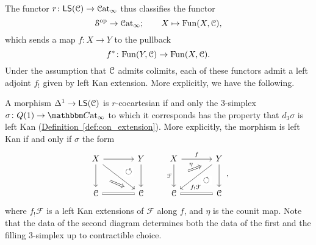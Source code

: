 \documentclass[main.tex]{subfiles}
\begin{document}
The functor $r\colon \mathsf{LS}(\mathcal{C}) \to \mathcal{C}\mathrm{at}_{\infty}$ thus classifies the functor
\begin{equation*}
  \mathcal{S}^{\mathrm{op}} \to \mathcal{C}\mathrm{at}_{\infty};\qquad X \mapsto \mathrm{Fun}(X, \mathcal{C}),
\end{equation*}
which sends a map $f\colon X \to Y$ to the pullback
\begin{equation*}
  f^{*}\colon \mathrm{Fun}(Y, \mathcal{C}) \to \mathrm{Fun}(X, \mathcal{C}).
\end{equation*}
Under the assumption that $\mathcal{C}$ admits colimits, each of these functors admit a left adjoint $f_{!}$ given by left Kan extension. More explicitly, we have the following.
\begin{proposition}
  A morphism $\Delta^{1} \to \mathsf{LS}(\mathcal{C})$ is $r$-cocartesian if and only the 3-simplex $\sigma\colon Q(1) \to \ICCat$ to which it corresponds has the property that $d_{3}\sigma$ is left Kan (\hyperref[def:con_extension]{Definition~\ref*{def:con_extension}}). More explicitly, the morphism is left Kan if and only if $\sigma$ the form
  \begin{equation*}
    \begin{tikzcd}[column sep=large, row sep=large]
      X
      \arrow[r]
      \arrow[d, ""{name=L, right}]
      \arrow[dr]
      & Y
      \arrow[d, ""{name=R, left}]
      \arrow[from=l, to=R, phantom, near end, "\circlearrowleft"{description}]
      \\
      \category{C}
      & \category{C}
      \arrow[l, equals]
      \arrow[from=L, Rightarrow, shorten=3ex]
    \end{tikzcd}
    \qquad
    \begin{tikzcd}[column sep=large, row sep=large]
      X
      \arrow[r, "f"]
      \arrow[d, "\mathcal{F}"{swap}, ""{name=L, right}]
      & Y
      \arrow[d, ""{name=R, left}]
      \arrow[dl, near end, "f_{!}\mathcal{F}"]
      \\
      \category{C}
      \arrow[from=R, phantom, near start, "\circlearrowleft"{description}]
      & \category{C}
      \arrow[l, equals]
      \arrow[from=L, to=u, shorten=3ex, Rightarrow, "\eta"]
    \end{tikzcd},
  \end{equation*}
  where $f_{!}\mathcal{F}$ is a left Kan extensions of $\mathcal{F}$ along $f$, and $\eta$ is the counit map. Note that the data of the second diagram determines both the data of the first and the filling 3-simplex up to contractible choice.
\end{proposition}
\end{document}
